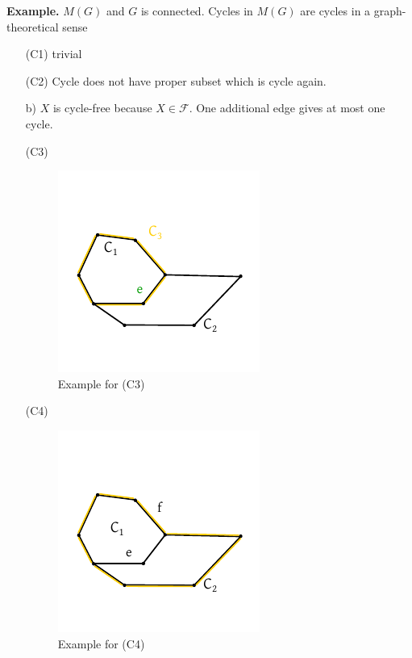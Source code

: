 \documentclass[a4paper]{article}
\theoremstyle{definition}
\begin{document}
\textbf{Example.}
  $M(G)$ and $G$ is connected.
  Cycles in $M(G)$ are cycles in a graph-theoretical sense
  \begin{itemize}
    \item[(C1)] trivial
    \item[(C2)] Cycle does not have proper subset which is cycle again.
    \item[b)] $X$ is cycle-free because $X \in \mathcal{F}$. One additional edge gives at most one cycle.
    \item[(C3)]
      \begin{figure}[!ht]
        \begin{center}
          \includegraphics{img/example_cycles.pdf}
          \caption{Example for (C3)}
        \end{center}
      \end{figure}
    \item[(C4)]
      \begin{figure}[!ht]
        \begin{center}
          \includegraphics{img/example_cycles_C4.pdf}
          \caption{Example for (C4)}
        \end{center}
      \end{figure}
  \end{itemize}
\end{document}
